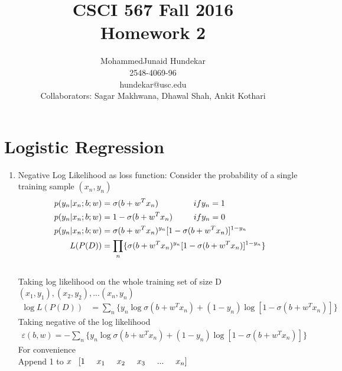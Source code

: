 \documentclass[12pt]{article}
\begin{document}
\title{CSCI 567 Fall 2016 \\Homework 2}
\author{MohammedJunaid Hundekar \\2548-4069-96 \\hundekar@usc.edu\\
	   Collaborators: Sagar Makhwana, Dhawal Shah, Ankit Kothari}
\maketitle
\section{Logistic Regression}
\begin{enumerate}[label=\alph*.]
    \item Negative Log Likelihood as loss function:
    Consider the  probability of a single training sample $(x_n,y_n)$\\
	\begin{align}
	 	p(y_n|x_n;b;w) &= \sigma(b+w^T x_n) \hspace{15mm}   if y_n = 1\\
        p(y_n|x_n;b;w) &= 1 - \sigma(b+w^T x_n) \hspace{9mm} if y_n = 0\\
        p(y_n|x_n;b;w) &= \sigma(b+w^T x_n)^{y_n}   [1 - \sigma(b+w^T x_n)]^{1-y_n}\\
        L(P(D)) &= \prod_n \{ \sigma(b+w^T x_n)^{y_n}   [1 - \sigma(b+w^T x_n)]^{1-y_n} \}
	\end{align}\\
    Taking log likelihood on the whole training set of size D$(x_1,y_1), (x_2,y_2),...(x_n,y_n)$\\
    \begin{align}
    \log L(P(D)) &= \sum_n \{ y_n\log \sigma(b+w^T x_n) + (1-y_n) \log[1 - \sigma(b+w^T x_n)] \}
    \end{align}
    Taking negative of the log likelihood\\
    \begin{align}
    \varepsilon(b,w) = - \sum_n \{ y_n\log \sigma(b+w^T x_n) + (1-y_n) \log[1 - \sigma(b+w^T x_n)] \}
	\end{align}
    For convenience\\ 
    Append 1 to $x \hspace{3mm} [1 \hspace{5mm} x_1 \hspace{5mm} x_2 \hspace{5mm} x_3 \hspace{5mm} ... \hspace{5mm} x_n]$\\

\end{enumerate}
\end{document}

